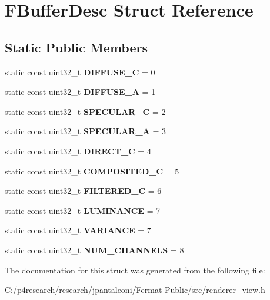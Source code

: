 \hypertarget{struct_f_buffer_desc}{}\section{F\+Buffer\+Desc Struct Reference}
\label{struct_f_buffer_desc}
\subsection*{Static Public Members}
\begin{DoxyCompactItemize}
\item 
\mbox{\label{struct_f_buffer_desc_a3097c931b229ccb29ac02776dbd85c01}} 
static const uint32\+\_\+t {\bfseries D\+I\+F\+F\+U\+S\+E\+\_\+C} = 0
\item 
\mbox{\label{struct_f_buffer_desc_a9503215e764f93c5268f9ba6c91d450d}} 
static const uint32\+\_\+t {\bfseries D\+I\+F\+F\+U\+S\+E\+\_\+A} = 1
\item 
\mbox{\label{struct_f_buffer_desc_abc6e14ad844b1ac5436edc390fbdc947}} 
static const uint32\+\_\+t {\bfseries S\+P\+E\+C\+U\+L\+A\+R\+\_\+C} = 2
\item 
\mbox{\label{struct_f_buffer_desc_a0cf10fc33e0f28b82654dcb6f80ae9cf}} 
static const uint32\+\_\+t {\bfseries S\+P\+E\+C\+U\+L\+A\+R\+\_\+A} = 3
\item 
\mbox{\label{struct_f_buffer_desc_a5d15e3ba3b48483829907d04dcf0a632}} 
static const uint32\+\_\+t {\bfseries D\+I\+R\+E\+C\+T\+\_\+C} = 4
\item 
\mbox{\label{struct_f_buffer_desc_a99b14c1faa56ecc613baa8fbd4e1b8ad}} 
static const uint32\+\_\+t {\bfseries C\+O\+M\+P\+O\+S\+I\+T\+E\+D\+\_\+C} = 5
\item 
\mbox{\label{struct_f_buffer_desc_aaf594116f1248db22e8f47d711230f3c}} 
static const uint32\+\_\+t {\bfseries F\+I\+L\+T\+E\+R\+E\+D\+\_\+C} = 6
\item 
\mbox{\label{struct_f_buffer_desc_aa5da90b2c01d14b166c5644591c93c08}} 
static const uint32\+\_\+t {\bfseries L\+U\+M\+I\+N\+A\+N\+CE} = 7
\item 
\mbox{\label{struct_f_buffer_desc_a375a0664c985490ecbc594b2590301e3}} 
static const uint32\+\_\+t {\bfseries V\+A\+R\+I\+A\+N\+CE} = 7
\item 
\mbox{\label{struct_f_buffer_desc_a12207478c5c57c42fe5c5d3b6dd52dfb}} 
static const uint32\+\_\+t {\bfseries N\+U\+M\+\_\+\+C\+H\+A\+N\+N\+E\+LS} = 8
\end{DoxyCompactItemize}


The documentation for this struct was generated from the following file\+:\begin{DoxyCompactItemize}
\item 
C\+:/p4research/research/jpantaleoni/\+Fermat-\/\+Public/src/renderer\+\_\+view.\+h\end{DoxyCompactItemize}
